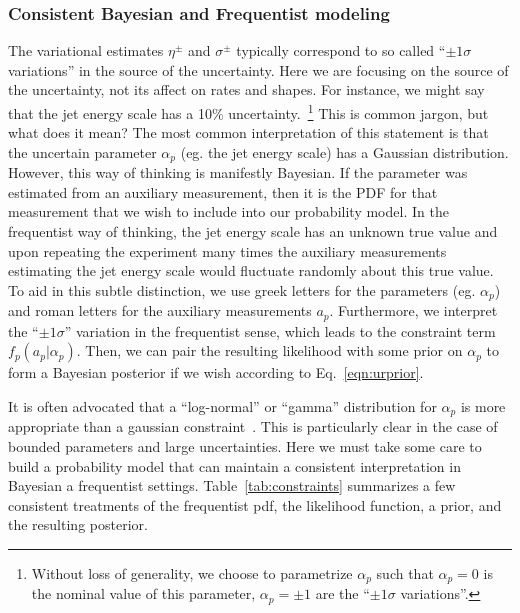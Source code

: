\subsubsection{Consistent Bayesian and Frequentist modeling}
\label{S:ConstraintExamples} 

The variational estimates $\eta^\pm$ and $\sigma^\pm$ typically correspond to so called ``$\pm 1\sigma$ variations'' in the source of the uncertainty.  Here we are focusing on the source of the uncertainty, not its affect on rates and shapes.  For instance, we might say that the jet energy scale has a 10\% uncertainty.~\footnote{Without loss of generality, we choose to parametrize $\alpha_p$ such that $\alpha_p=0$ is the nominal value of this parameter, $\alpha_p=\pm 1$ are the ``$\pm 1\sigma$ variations''.}  This is common jargon, but what does it mean?  The most common interpretation of this statement is that the uncertain parameter $\alpha_p$ (eg. the jet energy scale) has a Gaussian distribution.  However, this way of thinking is manifestly Bayesian.  If the parameter was estimated from an auxiliary measurement, then it is the PDF for that measurement that we wish to include into our probability model.  In the frequentist way of thinking, the jet energy scale has an unknown true value and upon repeating the experiment many times the auxiliary measurements estimating the jet energy scale would fluctuate randomly about this true value.  To aid in this subtle distinction, we use greek letters for the parameters (eg. $\alpha_p$) and roman letters for the auxiliary measurements $a_p$.  Furthermore, we interpret the ``$\pm 1\sigma$'' variation in the frequentist sense, which leads to the constraint term $f_p(a_p | \alpha_p)$.  Then, we can pair the resulting likelihood with some prior on $\alpha_p$ to form a Bayesian posterior if we wish according to Eq.~\ref{eqn:urprior}.


It is often advocated that a ``log-normal'' or ``gamma'' distribution for $\alpha_p$ is more appropriate than a gaussian constraint~\cite{CousinsLogNormal}.  This is particularly clear in the case of bounded parameters and large uncertainties.    Here we must take some care to build a probability model that can maintain a consistent interpretation in Bayesian a frequentist settings.  Table~\ref{tab:constraints} summarizes a few consistent treatments of the frequentist pdf, the likelihood function, a prior, and the resulting posterior.


